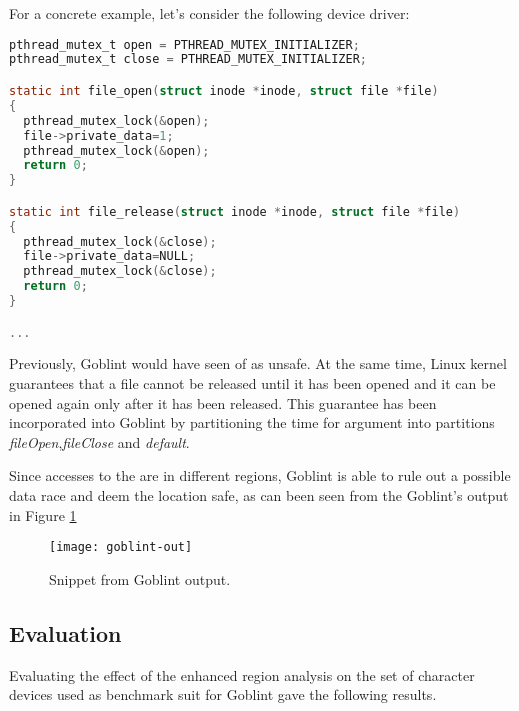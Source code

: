 \documentclass[..thesis.tex]{subfiles}
\begin{document}


For a concrete example, let's consider the following device driver:

\begin{lstlisting}[language=c,style=def,columns=fullflexible]
pthread_mutex_t open = PTHREAD_MUTEX_INITIALIZER;
pthread_mutex_t close = PTHREAD_MUTEX_INITIALIZER;

static int file_open(struct inode *inode, struct file *file)
{
  pthread_mutex_lock(&open);
  file->private_data=1; 
  pthread_mutex_lock(&open);
  return 0;
}

static int file_release(struct inode *inode, struct file *file)
{
  pthread_mutex_lock(&close);
  file->private_data=NULL; 
  pthread_mutex_lock(&close);
  return 0;
}

...
\end{lstlisting}

Previously, Goblint would have seen  of  as unsafe. At the same time, Linux kernel guarantees that a file cannot be released until it has been opened and it can be opened again only after it has been released. This guarantee has been incorporated into Goblint by partitioning the time for  argument into partitions \textit{fileOpen},\textit{fileClose} and \textit{default}. 

Since accesses to the  are in different regions, Goblint is able to rule out a possible data race and deem the location safe, as can been seen from the Goblint's output in Figure \ref{Goblint-example}

\begin{figure}[H]
\texttt{[image: goblint-out]}
\caption{Snippet from Goblint output.}
\label{Goblint-example}
\end{figure}

\subsection{Evaluation}

Evaluating the effect of the enhanced region analysis on the set of character devices used as benchmark suit for Goblint gave the following results.
\end{document}
